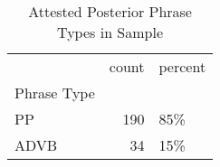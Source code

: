 \begin{table}[htbp!]
\centering
\caption{Attested Posterior Phrase Types in Sample}
\label{table:post_phtype_ct}
\begin{tabular}{lrl}
\toprule
{} &  count & percent \\
Phrase Type &        &         \\
\midrule
PP          &    190 &     85\% \\
ADVB        &     34 &     15\% \\
\bottomrule
\end{tabular}
\end{table}
